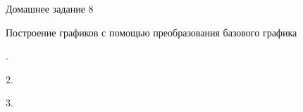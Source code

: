 \documentclass{article}
\begin{document}
{\fontsize{20}{18} \selectfont Домашнее задание 8}

\vspace{1cm}

{\fontsize{16}{14} \selectfont Построение графиков с помощью преобразования базового графика}

\vspace{1cm}



{\fontsize{12}{10} .\ \scalebox{1.2}{$y(x) = 2 \cdot x + 4$}

    \vspace{0.5cm}

    2.\ \scalebox{1.2}{$y(x) = 5 \cdot x - 3$}

    \vspace{0.5cm}

    3.\ 
}
\end{document}
